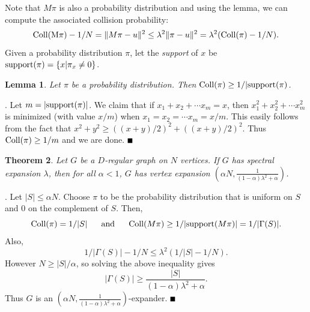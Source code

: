\documentclass{article}
\newtheorem{theorem}{Theorem}[section]
\newtheorem{lemma}[theorem]{Lemma}
\newcommand{\bproof}{\noindent{\bf Proof}}
\newcommand{\eproof}{\hspace*{\fill}$\rule{2mm}{2mm}$~~~~\bigskip}
\renewenvironment{proof}{\bproof. }{\eproof}
\begin{document}
Note that $M\pi$ is also a probability distribution and using the lemma, we can compute the associated collision probability:
\[
{\rm Coll(M\pi )}-1/N=\|M\pi -u\|^2\leq \lambda^2\|\pi -u\|^2=\lambda^2({\rm Coll(\pi)}-1/N).
\]
Given a probability distribution $\pi$, let the {\em support} of $x$ be ${\rm support (\pi)}=\{ x|\pi_x\neq 0\}$.
\begin{lemma}
Let $\pi$ be a probability distribution. Then ${\rm Coll(\pi)}\geq1/|{\rm support (\pi)}$.
\end{lemma}
\begin{proof}
Let $m=|{\rm support (\pi)}|$. We claim that if $x_1+x_2+\cdots x_m=x$, then $x_1^2+x_2^2+\cdots x_m^2$ is minimized (with value $x/m$) when $x_1=x_2=\cdots x_m=x/m$. This easily follows from the fact that $x^2+y^2\geq ((x+y)/2)^2+((x+y)/2)^2$. Thus ${\rm Coll (\pi)}\geq 1/m$ and we are done.
\end{proof}
\begin{theorem}
Let $G$ be a $D$-regular graph on $N$ vertices. If $G$ has spectral expansion $\lambda$, then for all $\alpha <1$, $G$ has vertex expansion $(\alpha N,\frac{1}{(1-\alpha )\lambda^2+\alpha })$.
\end{theorem}
\begin{proof}
Let $|S|\leq\alpha N$. Choose $\pi$ to be the probability distribution that is uniform on $S$ and $0$ on the complement of $S$. Then,
\[
{\rm Coll (\pi)}=1/|S|~~~~~{\rm and}~~~~~{\rm Coll(}M\pi{\rm )}\geq 1/|{\rm support(}M\pi {\rm )}|=1/|\Gamma (S)|.
\]
Also,
\[
1/|\Gamma (S)|-1/N\leq \lambda^2(1/|S|-1/N).
\]
However $N\geq |S|/\alpha$, so solving the above inequality gives
\[
|\Gamma (S)|\geq \frac{|S|}{(1-\alpha )\lambda^2+\alpha}.
\]
Thus $G$ is an $(\alpha N, \frac{1}{(1-\alpha)\lambda^2+\alpha })$-expander.
\end{proof}
\end{document}

